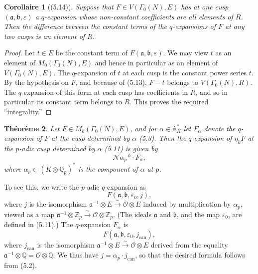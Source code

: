 \documentclass[12pt,a4paper]{article}
\theoremstyle{plain}
\newtheorem{theorem}{Th\'{e}or\`{e}me}[section]
\newtheorem{corollary}[theorem]{Corollaire}
\theoremstyle{definition}
\theoremstyle{remark}
\newenvironment{namedtheorem}[1][]{%
  \renewcommand{\thetheorem}{#1}%
  \theoremstyle{plain}%
  \begin{theorem}%
}{\end{theorem}\renewcommand{\thetheorem}{\arabic{section}.\arabic{theorem}}}
\begin{document}
\begin{corollary}[(5.14)]
Suppose that $F \in V(\Gamma_0(N), E)$ has at one cusp $(\mathfrak{a}, \mathfrak{b}, \varepsilon)$ a $q$-expansion whose non-constant coefficients are all elements of $R$. Then the difference between the constant terms of the $q$-expansions of $F$ at any two cusps is an element of $R$.
\end{corollary}

\begin{proof}
Let $t \in E$ be the constant term of $F(\mathfrak{a}, \mathfrak{b}, \varepsilon)$. We may view $t$ as an element of $M_0(\Gamma_0(N), E)$ and hence in particular as an element of $V(\Gamma_0(N), E)$. The $q$-expansion of $t$ at each cusp is the constant power series $t$. By the hypothesis on $F$, and because of (5.13), $F - t$ belongs to $V(\Gamma_0(N), R)$. The $q$-expansion of this form at each cusp has coefficients in $R$, and so in particular its constant term belongs to $R$. This proves the required ``integrality.''
\end{proof}

\begin{namedtheorem}[(5.15)]
Let $F \in M_k(\Gamma_0(N), E)$, and for $\alpha \in \mathbb{A}_K^*$ let $F_\alpha$ denote the $q$-expansion of $F$ at the cusp determined by $\alpha$ (5.3). Then the $q$-expansion of $\eta_k F$ at the $p$-adic cusp determined by $\alpha$ (5.11) is given by
\[
\mathcal{N}\alpha_p^{-k} \cdot F_\alpha,
\]
where $\alpha_p \in (K \otimes \mathbb{Q}_p)^*$ is the component of $\alpha$ at $p$.
\end{namedtheorem}

To see this, we write the $p$-adic $q$-expansion as
\[
F(\mathfrak{a}, \mathfrak{b}, \varepsilon_0, j),
\]
where $j$ is the isomorphism $\mathfrak{a}^{-1} \otimes E \xrightarrow{\sim} \mathcal{O} \otimes E$ induced by multiplication by $\alpha_p$, viewed as a map $\mathfrak{a}^{-1} \otimes \mathbb{Z}_p \xrightarrow{\sim} \mathcal{O} \otimes \mathbb{Z}_p$. (The ideals $\mathfrak{a}$ and $\mathfrak{b}$, and the map $\varepsilon_0$, are defined in (5.11).) The $q$-expansion $F_\alpha$ is
\[
F(\mathfrak{a}, \mathfrak{b}, \varepsilon_0, j_{\mathrm{can}}),
\]
where $j_{\mathrm{can}}$ is the isomorphism $\mathfrak{a}^{-1} \otimes E \xrightarrow{\sim} \mathcal{O} \otimes E$ derived from the equality $\mathfrak{a}^{-1} \otimes \mathbb{Q} = \mathcal{O} \otimes \mathbb{Q}$. We thus have $j = \alpha_p \cdot j_{\mathrm{can}}$, so that the desired formula follows from (5.2).
\end{document}
